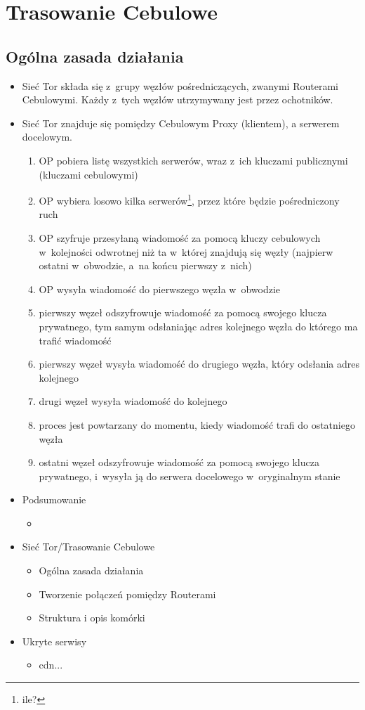 \section{Trasowanie Cebulowe}

\subsection{Ogólna zasada działania}
\begin{itemize}
  \item Sieć Tor składa się z~grupy węzłów pośredniczących, zwanymi Routerami Cebulowymi. Każdy z~tych węzłów utrzymywany jest przez ochotników.
  \item Sieć Tor znajduje się pomiędzy Cebulowym Proxy (klientem), a serwerem docelowym.
  \begin{enumerate}
    \item OP pobiera listę wszystkich serwerów, wraz z~ich kluczami publicznymi (kluczami cebulowymi)
    \item OP wybiera losowo kilka serwerów\footnote{ile?}, przez które będzie pośredniczony ruch
    \item OP szyfruje przesyłaną wiadomość za pomocą kluczy cebulowych w~kolejności odwrotnej niż ta w~której znajdują się węzły (najpierw ostatni w~obwodzie, a~na końcu pierwszy z~nich)
    \item OP wysyła wiadomość do pierwszego węzła w~obwodzie
    \item pierwszy węzeł odszyfrowuje wiadomość za pomocą swojego klucza prywatnego, tym samym odsłaniając adres kolejnego węzła do którego ma trafić wiadomość
    \item pierwszy węzeł wysyła wiadomość do drugiego węzła, który odsłania adres kolejnego
    \item drugi węzeł wysyła wiadomość do kolejnego
    \item proces jest powtarzany do momentu, kiedy wiadomość trafi do ostatniego węzła 
    \item ostatni węzeł odszyfrowuje wiadomość za pomocą swojego klucza prywatnego, i~wysyła ją do serwera docelowego w~oryginalnym stanie
  \end{enumerate}
  \item Podsumowanie
  \begin{itemize}
    \item 
  \end{itemize}
\end{itemize}

\begin{itemize}
  \item Sieć Tor/Trasowanie Cebulowe
  \begin{itemize}
    \item Ogólna zasada działania
    \item Tworzenie połączeń pomiędzy Routerami
    \item Struktura i opis komórki
  \end{itemize}
  \item Ukryte serwisy
  \begin{itemize}
    \item cdn...
  \end{itemize}
\end{itemize}